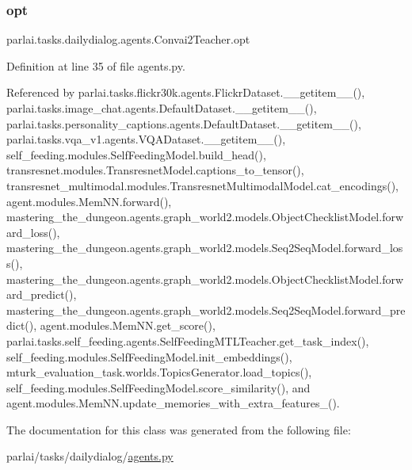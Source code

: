 \mbox{\label{classparlai_1_1tasks_1_1dailydialog_1_1agents_1_1Convai2Teacher_a371a92d402235c804fcfc06d57272e1d}} 
\subsubsection{\texorpdfstring{opt}{opt}}
{\footnotesize\ttfamily parlai.\+tasks.\+dailydialog.\+agents.\+Convai2\+Teacher.\+opt}



Definition at line 35 of file agents.\+py.



Referenced by parlai.\+tasks.\+flickr30k.\+agents.\+Flickr\+Dataset.\+\_\+\+\_\+getitem\+\_\+\+\_\+(), parlai.\+tasks.\+image\+\_\+chat.\+agents.\+Default\+Dataset.\+\_\+\+\_\+getitem\+\_\+\+\_\+(), parlai.\+tasks.\+personality\+\_\+captions.\+agents.\+Default\+Dataset.\+\_\+\+\_\+getitem\+\_\+\+\_\+(), parlai.\+tasks.\+vqa\+\_\+v1.\+agents.\+V\+Q\+A\+Dataset.\+\_\+\+\_\+getitem\+\_\+\+\_\+(), self\+\_\+feeding.\+modules.\+Self\+Feeding\+Model.\+build\+\_\+head(), transresnet.\+modules.\+Transresnet\+Model.\+captions\+\_\+to\+\_\+tensor(), transresnet\+\_\+multimodal.\+modules.\+Transresnet\+Multimodal\+Model.\+cat\+\_\+encodings(), agent.\+modules.\+Mem\+N\+N.\+forward(), mastering\+\_\+the\+\_\+dungeon.\+agents.\+graph\+\_\+world2.\+models.\+Object\+Checklist\+Model.\+forward\+\_\+loss(), mastering\+\_\+the\+\_\+dungeon.\+agents.\+graph\+\_\+world2.\+models.\+Seq2\+Seq\+Model.\+forward\+\_\+loss(), mastering\+\_\+the\+\_\+dungeon.\+agents.\+graph\+\_\+world2.\+models.\+Object\+Checklist\+Model.\+forward\+\_\+predict(), mastering\+\_\+the\+\_\+dungeon.\+agents.\+graph\+\_\+world2.\+models.\+Seq2\+Seq\+Model.\+forward\+\_\+predict(), agent.\+modules.\+Mem\+N\+N.\+get\+\_\+score(), parlai.\+tasks.\+self\+\_\+feeding.\+agents.\+Self\+Feeding\+M\+T\+L\+Teacher.\+get\+\_\+task\+\_\+index(), self\+\_\+feeding.\+modules.\+Self\+Feeding\+Model.\+init\+\_\+embeddings(), mturk\+\_\+evaluation\+\_\+task.\+worlds.\+Topics\+Generator.\+load\+\_\+topics(), self\+\_\+feeding.\+modules.\+Self\+Feeding\+Model.\+score\+\_\+similarity(), and agent.\+modules.\+Mem\+N\+N.\+update\+\_\+memories\+\_\+with\+\_\+extra\+\_\+features\+\_\+().



The documentation for this class was generated from the following file\+:\begin{DoxyCompactItemize}
\item 
parlai/tasks/dailydialog/\hyperlink{parlai_2tasks_2dailydialog_2agents_8py}{agents.\+py}\end{DoxyCompactItemize}
